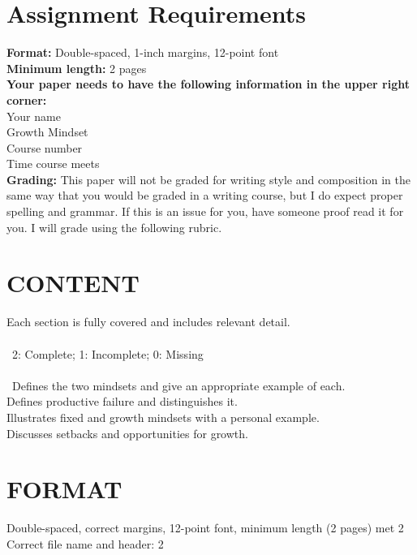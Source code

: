 \documentclass{article}
\begin{document}
\newpage
\section*{Assignment Requirements}
\textbf{Format:} Double-spaced, 1-inch margins, 12-point font\\
\textbf{Minimum length:} 2 pages\\

\noindent\textbf{Your paper needs to have the following information in the upper right corner:}\\
Your name\\
Growth Mindset\\
Course number \\
Time course meets\\

\textbf{Grading:} This paper will not be graded for writing style and composition in the same way that you would be graded in a writing course, but I do expect proper spelling and grammar. If this is an issue for you, have someone proof read it for you. I will grade using the following rubric.

\section*{CONTENT}
Each section is fully covered and includes relevant detail.\\\\\
2: Complete; 1: Incomplete; 0: Missing\\ \\\
Defines the two mindsets and give an appropriate example of each. \hfill{} \enspace{} \enspace{}\\
Defines productive failure and distinguishes it. \hfill{} \enspace{} \enspace{}\\
Illustrates fixed and growth mindsets with a personal example. \hfill\enspace 0 \enspace\enspace 1 \enspace\enspace 2\\
Discusses setbacks and opportunities for growth. \hfill\enspace 0 \enspace\enspace 1 \enspace\enspace 2\\

\section*{FORMAT}
Double-spaced, correct margins, 12-point font, minimum length (2 pages) met \hfill{} \enspace{} {\enspace\enspace \color{white} 2}\\
Correct file name and header: \hfill{} \enspace{} {\enspace\enspace \color{white} 2}
\end{document}
